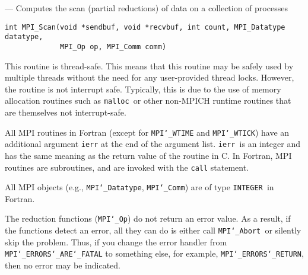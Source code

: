 \startmanpage
{}
--- Computes the scan (partial reductions) of data on a collection of processes 
\startvb\begin{verbatim}
int MPI_Scan(void *sendbuf, void *recvbuf, int count, MPI_Datatype datatype, 
             MPI_Op op, MPI_Comm comm)

\end{verbatim}
\endvb

\par
{}
\par
{}
\par
This routine is thread-safe.  This means that this routine may be
safely used by multiple threads without the need for any user-provided
thread locks.  However, the routine is not interrupt safe.  Typically,
this is due to the use of memory allocation routines such as {\tt malloc
}or other non-MPICH runtime routines that are themselves not interrupt-safe.
\par
{}
All MPI routines in Fortran (except for {\tt MPI{\tt \char`\_}WTIME} and {\tt MPI{\tt \char`\_}WTICK}) have
an additional argument {\tt ierr} at the end of the argument list.  {\tt ierr
}is an integer and has the same meaning as the return value of the routine
in C.  In Fortran, MPI routines are subroutines, and are invoked with the
{\tt call} statement.
\par
All MPI objects (e.g., {\tt MPI{\tt \char`\_}Datatype}, {\tt MPI{\tt \char`\_}Comm}) are of type {\tt INTEGER
}in Fortran.
\par
{}
\par
The reduction functions ({\tt MPI{\tt \char`\_}Op}) do not return an error value.  As a result,
if the functions detect an error, all they can do is either call {\tt MPI{\tt \char`\_}Abort
}or silently skip the problem.  Thus, if you change the error handler from
{\tt MPI{\tt \char`\_}ERRORS{\tt \char`\_}ARE{\tt \char`\_}FATAL} to something else, for example, {\tt MPI{\tt \char`\_}ERRORS{\tt \char`\_}RETURN},
then no error may be indicated.
